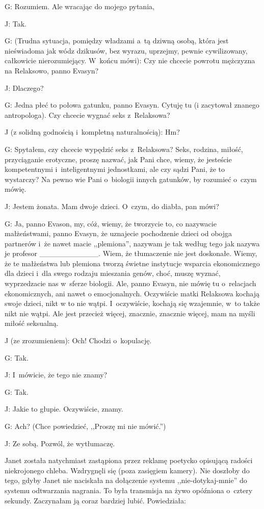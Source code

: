 \documentclass[oneside,polish,12pt,sfheadings]{mwbk}
\begin{document}
G: Rozumiem. Ale wracając do mojego pytania, 

J: Tak.

G: (Trudna sytuacja, pomiędzy władzami a~tą dziwną osobą, która jest
nieświadoma jak wódz dzikusów, bez wyrazu, uprzejmy, pewnie cywilizowany,
całkowicie nierozumiejący. W~końcu mówi): Czy nie chcecie powrotu
mężczyzna na Relaksowo, panno Evasyn?

J: Dlaczego?

G: Jedna płeć to połowa gatunku, panno Evasyn. Cytuję tu (i zacytował
znanego antropologa). Czy chcecie wygnać seks z~Relaksowa?

J (z solidną godnością i~kompletną naturalnością): Hm?

G: Spytałem, czy chcecie wypędzić seks z~Relaksowa? Seks, rodzina,
miłość, przyciąganie erotyczne, proszę nazwać, jak Pani chce, wiemy,
że jesteście kompetentnymi i~inteligentnymi jednostkami, ale czy sądzi
Pani, że to wystarczy? Na pewno wie Pani o~biologii innych gatunków,
by rozumieć o~czym mówię.

J: Jestem żonata. Mam dwoje dzieci. O~czym, do diabła, pan mówi?

G: Ja, panno Evason, my, cóż, wiemy, że tworzycie to, co nazywacie
małżeństwami, panno Evasyn, że uznajecie pochodzenie dzieci od obojga
partnerów i~że nawet macie ,,plemiona'', nazywam je tak według tego
jak nazywa je profesor \_\_\_\_\_\_\_\_\_\_\_. Wiem, że tłumaczenie
nie jest doskonałe. Wiemy, że te małżeństwa lub plemiona tworzą świetne
instytucje wsparcia ekonomicznego dla dzieci i~dla swego rodzaju mieszania
genów, choć, muszę wyznać, wyprzedzacie nas w~sferze biologii. Ale,
panno Evasyn, nie mówię tu o~relacjach ekonomicznych, ani nawet o
emocjonalnych. Oczywiście matki Relaksowa kochają swoje dzieci, nikt
w to nie wątpi. I~oczywiście, kochają się wzajemnie, w~to także nikt
nie wątpi. Ale jest przecież więcej, znacznie, znacznie więcej, mam
na myśli miłość seksualną.

J (ze zrozumieniem): Och! Chodzi o~kopulację.

G: Tak.

J: I~mówicie, że tego nie znamy?

G: Tak.

J: Jakie to głupie. Oczywiście, znamy.

G: Ach? (Chce powiedzieć, ,,Proszę mi nie mówić.'')

J: Ze sobą. Pozwól, że wytłumaczę.

Janet została natychmiast zastąpiona przez reklamę poetycko opisującą
radości niekrojonego chleba. Wzdrygnęli się (poza zasięgiem kamery).
Nie doszłoby do tego, gdyby Janet nie naciskała na dołączenie systemu
,,nie-dotykaj-mnie'' do systemu odtwarzania nagrania. To była transmisja
na żywo opóźniona o~cztery sekundy. Zaczynałam ją coraz bardziej lubić.
Powiedziała: 
\end{document}
